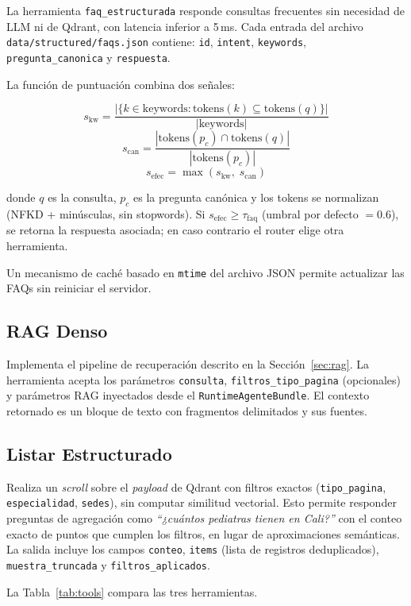 \documentclass[conference]{IEEEtran}
\newcommand{\code}[1]{\texttt{\small #1}}
\begin{document}
La herramienta \code{faq\_estructurada} responde consultas frecuentes sin
necesidad de LLM ni de Qdrant, con latencia inferior a 5\,ms. Cada entrada
del archivo \code{data/structured/faqs.json} contiene: \code{id},
\code{intent}, \code{keywords}, \code{pregunta\_canonica} y \code{respuesta}.

La función de puntuación combina dos señales:

\[
s_\text{kw} = \frac{|\{k \in \text{keywords} : \text{tokens}(k) \subseteq \text{tokens}(q)\}|}{|\text{keywords}|}
\]
\[
s_\text{can} = \frac{|\text{tokens}(p_c) \cap \text{tokens}(q)|}{|\text{tokens}(p_c)|}
\]
\[
s_\text{efec} = \max(s_\text{kw},\; s_\text{can})
\]

donde $q$ es la consulta, $p_c$ es la pregunta canónica y los tokens se
normalizan (NFKD + minúsculas, sin stopwords). Si $s_\text{efec} \geq
\tau_\text{faq}$ (umbral por defecto $= 0.6$), se retorna la respuesta
asociada; en caso contrario el router elige otra herramienta.

Un mecanismo de caché basado en \code{mtime} del archivo JSON permite
actualizar las FAQs sin reiniciar el servidor.

\subsection{RAG Denso}

Implementa el pipeline de recuperación descrito en la Sección~\ref{sec:rag}.
La herramienta acepta los parámetros \code{consulta},
\code{filtros\_tipo\_pagina} (opcionales) y parámetros RAG inyectados desde
el \code{RuntimeAgenteBundle}. El contexto retornado es un bloque de texto con
fragmentos delimitados y sus fuentes.

\subsection{Listar Estructurado}

Realiza un \textit{scroll} sobre el \textit{payload} de Qdrant con filtros
exactos (\code{tipo\_pagina}, \code{especialidad}, \code{sedes}), sin computar
similitud vectorial. Esto permite responder preguntas de agregación como
\textit{``¿cuántos pediatras tienen en Cali?''} con el conteo exacto de puntos
que cumplen los filtros, en lugar de aproximaciones semánticas. La salida
incluye los campos \code{conteo}, \code{items} (lista de registros
deduplicados), \code{muestra\_truncada} y \code{filtros\_aplicados}.

La Tabla~\ref{tab:tools} compara las tres herramientas.
\end{document}
